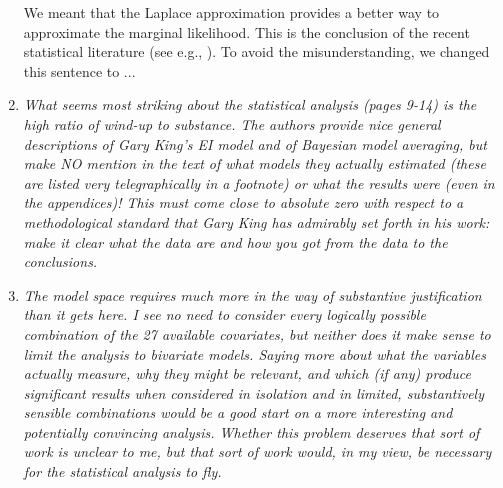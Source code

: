 \documentclass[11pt]{article}
\begin{document}
\begin{enumerate}
  We meant that the Laplace approximation provides a better way to
  approximate the marginal likelihood. This is the conclusion of the
  recent statistical literature (see e.g., ). To avoid the
  misunderstanding, we changed this sentence to ...
  
\item {\it What seems most striking about the statistical analysis (pages
  9-14) is the high ratio of wind-up to substance.  The authors
  provide nice general descriptions of Gary King's EI model and of
  Bayesian model averaging, but make NO mention in the text of what
  models they actually estimated (these are listed very
  telegraphically in a footnote) or what the results were (even in the
  appendices)!  This must come close to absolute zero with respect to
  a methodological standard that Gary King has admirably set forth in
  his work: make it clear what the data are and how you got from the
  data to the conclusions.}

\item {\it The model space requires much more in the way of
    substantive justification than it gets here.  I see no need to
    consider every logically possible combination of the 27 available
    covariates, but neither does it make sense to limit the analysis
    to bivariate models.  Saying more about what the variables
    actually measure, why they might be relevant, and which (if any)
    produce significant results when considered in isolation and in
    limited, substantively sensible combinations would be a good start
    on a more interesting and potentially convincing analysis.
    Whether this problem deserves that sort of work is unclear to me,
    but that sort of work would, in my view, be necessary for the
    statistical analysis to fly.}
 


 


\end{enumerate}
\end{document}
